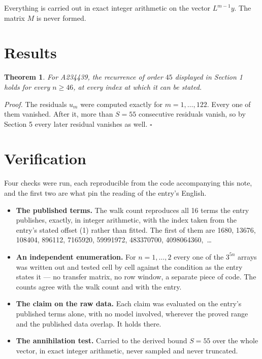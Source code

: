 \documentclass[11pt]{article}
\newtheorem{theorem}{Theorem}
\theoremstyle{definition}
\begin{document}
Everything is carried out in exact integer arithmetic on the vector $L^{m-1}y$. The matrix $M$ is never formed.

\section{Results}

\begin{theorem} For A234439, the recurrence of order $45$ displayed in Section 1 holds for every $n \ge 46$, at every index at which it can be stated.\end{theorem}

{\itshape Proof.} The residuals $u_m$ were computed exactly for $m = 1,\dots,122$. Every one of them vanished. After it, more than $S = 55$ consecutive residuals vanish, so by Section 5 every later residual vanishes as well. $\square$

\section{Verification}

Four checks were run, each reproducible from the code accompanying this note, and the first two are what pin the reading of the entry's English.

\begin{itemize}

\item {\bfseries The published terms.} The walk count reproduces all 16 terms the entry publishes, exactly, in integer arithmetic, with the index taken from the entry's stated offset (1) rather than fitted. The first of them are 1680, 13676, 108404, 896112, 7165920, 59991972, 483370700, 4098064360,~\dots

\item {\bfseries An independent enumeration.} For $n = 1,\dots,2$ every one of the $3^{5n}$ arrays was written out and tested cell by cell against the condition as the entry states it --- no transfer matrix, no row window, a separate piece of code. The counts agree with the walk count and with the entry.

\item {\bfseries The claim on the raw data.} Each claim was evaluated on the entry's published terms alone, with no model involved, wherever the proved range and the published data overlap. It holds there.

\item {\bfseries The annihilation test.} Carried to the derived bound $S = 55$ over the whole vector, in exact integer arithmetic, never sampled and never truncated.

\end{itemize}
\end{document}

